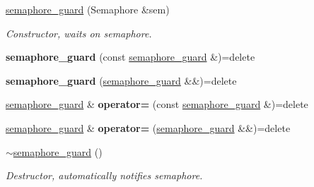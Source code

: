 \begin{DoxyCompactItemize}
\item 
\hyperlink{classcpen333_1_1process_1_1semaphore__guard_aa816ac26e4894b1945724944e7965968}{semaphore\+\_\+guard} (Semaphore \&sem)
\begin{DoxyCompactList}\small\item\em Constructor, waits on semaphore. \end{DoxyCompactList}\item 
\mbox{\label{classcpen333_1_1process_1_1semaphore__guard_a12dd43fa23381e3a44eabc8e8d1b55a9}} 
{\bfseries semaphore\+\_\+guard} (const \hyperlink{classcpen333_1_1process_1_1semaphore__guard}{semaphore\+\_\+guard} \&)=delete
\item 
\mbox{\label{classcpen333_1_1process_1_1semaphore__guard_a8e970b86d9083bcdfa2ec74950580c41}} 
{\bfseries semaphore\+\_\+guard} (\hyperlink{classcpen333_1_1process_1_1semaphore__guard}{semaphore\+\_\+guard} \&\&)=delete
\item 
\mbox{\label{classcpen333_1_1process_1_1semaphore__guard_aa500d54d3674dedc78b6ba2997244690}} 
\hyperlink{classcpen333_1_1process_1_1semaphore__guard}{semaphore\+\_\+guard} \& {\bfseries operator=} (const \hyperlink{classcpen333_1_1process_1_1semaphore__guard}{semaphore\+\_\+guard} \&)=delete
\item 
\mbox{\label{classcpen333_1_1process_1_1semaphore__guard_ab7c8a51385102e177d284855c96f7234}} 
\hyperlink{classcpen333_1_1process_1_1semaphore__guard}{semaphore\+\_\+guard} \& {\bfseries operator=} (\hyperlink{classcpen333_1_1process_1_1semaphore__guard}{semaphore\+\_\+guard} \&\&)=delete
\item 
\mbox{\label{classcpen333_1_1process_1_1semaphore__guard_a878eb8302eb619c83dc83d8995987fd1}} 
\hyperlink{classcpen333_1_1process_1_1semaphore__guard_a878eb8302eb619c83dc83d8995987fd1}{$\sim$semaphore\+\_\+guard} ()
\begin{DoxyCompactList}\small\item\em Destructor, automatically notifies semaphore. \end{DoxyCompactList}\end{DoxyCompactItemize}


